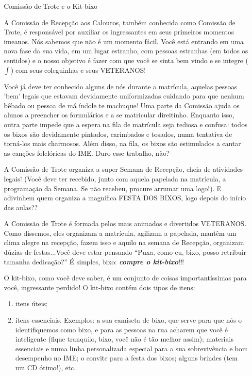 \begin{secao}{Comissão de Trote e o Kit-bixo}

A Comissão de Recepção aos Calouros, também conhecida como Comissão de Trote,
é responsável por auxiliar os ingressantes em seus primeiros momentos imeanos.
Nós sabemos que não é um momento fácil. Você está entrando em uma nova fase da
sua vida, em um lugar estranho, com pessoas estranhas (em todos os sentidos) e
o nosso objetivo é fazer com que você se sinta bem vindo e se integre ($\int$) com
seus coleguinhas e seus VETERANOS!

Você já deve ter conhecido alguns de nós durante a matrícula, aquelas pessoas
'bem' legais que estavam devidamente uniformizadas cuidando para que nenhum bêbado 
ou pessoa de má índole te machuque! Uma parte da Comissão ajuda os alunos a 
preencher os formulários e a se matricular direitinho. Enquanto isso,
outra parte impede que a espera na fila de matrícula seja tediosa e confusa: todos os bixos
são devidamente pintados, carimbados e tosados, numa tentativa de torná-los
mais charmosos. Além disso, na fila, os bixos são estimulados a cantar as canções
folclóricas do IME. Duro esse trabalho, não?

A Comissão de Trote organiza a super Semana de Recepção, cheia de atividades
legais! (Você deve ter recebido, junto com aquela papelada na matrícula, a
programação da Semana. Se não recebeu, procure arrumar uma logo!).                      
E adivinhem quem organiza a magnífica FESTA
DOS BIXOS, logo depois do início das aulas??

A Comissão de Trote é formada pelos mais animados e divertidos VETERANOS. Como
dissemos, eles organizam a matrícula, agilizam a papelada, mantêm um clima
alegre na recepção, fazem isso e aquilo na semana de Recepção, organizam dúzias
de festas...Você deve estar pensando ``Puxa, como eu, bixo, posso retribuir
tamanha dedicação?'' É simples, bixo: {\bf\em compre o kit-bixo}!!!

O kit-bixo, como você deve saber, é um conjunto de coisas importantíssimas
para você, ingressante perdido! O kit-bixo contém dois tipos de itens:
\begin{enumerate}

\item itens úteis; 
\item itens essenciais. Exemplos: a sua camiseta de bixo, que
serve para que nós o identifiquemos como bixo, e para as pessoas na rua acharem
que você é inteligente (fique tranquilo, bixo, você não é tão melhor assim);
materiais essenciais e numa linha personalizada especial
 para a sua sobrevivência e bom desempenho no IME; o convite para a festa dos bixos;
 alguns brindes (tem um CD ótimo!),
etc. 


\end{enumerate}
\end{secao}

